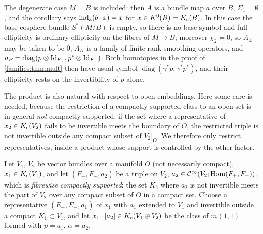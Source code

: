 \begin{remark}\label{families:rem:mult-degenerate}
  The degenerate case $M=B$ is included: then $A$ is a bundle map $a$ over $B$,
  $\Sigma_1=\emptyset$, and the corollary says $\operatorname{ind}_{\mathrm{a}}(b\cdot x)=x$ for $x\in
  K^0(B)=K_{\mathrm{c}}(B)$. In this case the base cosphere bundle $S^*(M/B)$ is empty,
  so there is no base symbol and full ellipticity is ordinary ellipticity on
  the fibres of $\tilde M\to B$; moreover $\chi_2=0$, so $\tilde A_\pm$ may be
  taken to be $0$, $A_\Pi$ is a family of finite rank smoothing operators, and
  $a_P=\operatorname{diag}(p\otimes\operatorname{Id}_{F_+},p^*\otimes\operatorname{Id}_{F_-})$. Both
  homotopies in the proof of \cref{families:thm:mult} then have usual symbol
  $\operatorname{diag}(\gamma^*p,\gamma^*p^*)$, and their ellipticity rests on
  the invertibility of $p$ alone.
\end{remark}

The product is also natural with respect to open embeddings. Here some care
is needed, because the restriction of a compactly supported class to an open
set is in general \emph{not} compactly supported: if the set where a
representative of $x_2\in K_{\mathrm{c}}(V_2)$ fails to be invertible meets the boundary
of $O$, the restricted triple is not invertible outside any compact subset of
$V_2|_O$. We therefore only restrict representatives, inside a product whose
support is controlled by the other factor.

\begin{definition}\label{families:def:restricted-product}
  Let $V_1$, $V_2$ be vector bundles over a manifold $O$ (not necessarily
  compact), $x_1\in K_{\mathrm{c}}(V_1)$, and let $(F_+,F_-,a_2)$ be a triple on $V_2$,
  $a_2\in\mathcal{C}^\infty(V_2;\operatorname{Hom}(F_+,F_-))$, which is \emph{fibrewise compactly
  supported}: the set $K_2$ where $a_2$ is not invertible meets the part of
  $V_2$ over any compact subset of $O$ in a compact set. Choose a representative
  $(E_+,E_-,a_1)$ of $x_1$ with $a_1$ extended to $V_1$ and invertible outside a
  compact $K_1\subset V_1$, and let $x_1\cdot[a_2]\in K_{\mathrm{c}}(V_1\oplus V_2)$ be the
  class of $m(1,1)$ formed with $p=a_1$, $\alpha=a_2$.
\end{definition}

